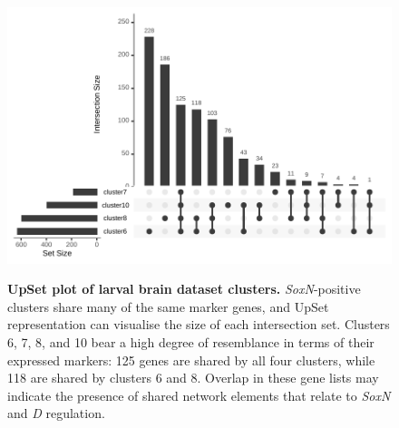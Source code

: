 \documentclass[withindex,glossary]{cam-thesis}
\begin{document}
\setcounter{figure}{14-1}
\begin{figure}[htbp]
\centering
\includegraphics[width=\textwidth]{figs/Fig14 Avalos Upset.pdf}
\label{fig14}
\caption{\textbf{UpSet plot of larval brain dataset clusters.} \emph{SoxN}-positive clusters share many of the same marker genes, and UpSet representation can visualise the size of each intersection set. Clusters 6, 7, 8, and 10 bear a high degree of resemblance in terms of their expressed markers: 125 genes are shared by all four clusters, while 118 are shared by clusters 6 and 8. Overlap in these gene lists may indicate the presence of shared network elements that relate to \emph{SoxN} and \emph{D} regulation.\vspace{0.5cm}}
\end{figure}
\end{document}
